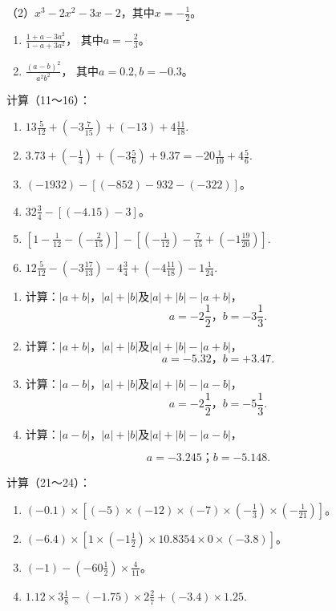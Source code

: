 （2）\(x^{3} - 2x^{2} - 3x - 2\)，其中\(x = -\frac{1}{2}\)。

\begin{enumerate}[start=9]
\item
  \(\frac{1 + a - 3a^2}{1 - a + 3a^2}\)， 其中\(a = -\frac{2}{3}\)。
\item
  \(\frac{(a - b)^2}{a^2b^2}\)， 其中\(a = 0.2, b = -0.3\)。
\end{enumerate}

计算（11～16）：

\begin{enumerate}[start=11]
\item
  \(13\frac{5}{12} +\left(-3\frac{7}{15}\right) + (-13) + 4\frac{11}{18}.\)
\item
  \(3.73 + \left(-\frac{1}{4}\right) + \left(-3\frac{5}{6}\right) + 9.37 = -20\frac{1}{10} + 4\frac{5}{6}.\)
\item
  \((-1932) - [(-852) - 932 - (-322)]\)。
\item
  \(32\frac{3}{4} - [(-4.15) - 3]\)。
\item
  \(\left[1 - \frac{1}{12} -\left(-\frac{2}{15}\right)\right] - \left[\left(-\frac{1}{12}\right) - \frac{7}{15} +\left(-1\frac{19}{20}\right)\right].\)
\item
  \(12\frac{5}{12} -\left(-3\frac{17}{13}\right) - 4\frac{3}{4} +\left(-4\frac{11}{18}\right) - 1\frac{1}{24}.\)
\end{enumerate}

\begin{enumerate}[start=17]
\item
  计算：\(|a+b|\)，\(|a|+|b|\)及\(|a|+|b|-|a+b|\)，
\[
a = - 2 \frac{1}{2}\text{，} b = - 3 \frac{1}{3}.
\]
\item
  计算：\(|a+b|\)，\(|a|+|b|\)及\(|a|+|b|-|a+b|\)，
\[
a = - 5.32\text{，} b = + 3.47.
\]
\item
  计算：\(|a-b|\)，\(|a|+|b|\)及\(|a|+|b|-|a-b|\)，
\[
a = - 2 \frac{1}{2}\text{，} b = - 5 \frac{1}{3}.
\]
\item
  计算：\(|a-b|\)，\(|a|+|b|\)及\(|a|+|b|-|a-b|\)，
\end{enumerate}

\[
a = - 3.245\text{；} b = - 5.148.
\]

计算（21～24）：

\begin{enumerate}[start=21]
\item
  \((-0.1) \times \left[(-5) \times (-12) \times (-7) \times \left(-\frac{1}{3}\right) \times \left(-\frac{1}{21}\right)\right]\)。
\item
  \((-6.4) \times \left[1 \times \left(-1\frac{1}{2}\right) \times 10.8354 \times 0 \times (-3.8)\right]\)。
\item
  \((-1) - \left(-60\frac{1}{2}\right) \times \frac{4}{11}\)。
\item
  \(1.12 \times 3\frac{1}{8} - (-1.75) \times 2\frac{2}{7} + (-3.4) \times 1.25.\)
\end{enumerate}

